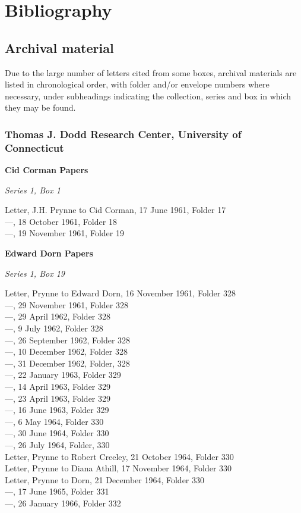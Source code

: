 \documentclass[]{article}
\begin{document}
\setlength{\parindent}{0pt}

\section{Bibliography}\label{bibliography}

\subsection{Archival material}\label{archival-material}

\singlespacing Due to the large number of letters cited from some boxes,
archival materials are listed in chronological order, with folder and/or
envelope numbers where necessary, under subheadings indicating the
collection, series and box in which they may be found.

\subsubsection{Thomas J. Dodd Research Center, University of
Connecticut}\label{thomas-j.-dodd-research-center-university-of-connecticut}

\textbf{Cid Corman Papers}

\emph{Series 1, Box 1}

Letter, J.H. Prynne to Cid Corman, 17 June 1961, Folder 17\\
—, 18 October 1961, Folder 18\\
—, 19 November 1961, Folder 19

\textbf{Edward Dorn Papers}

\emph{Series 1, Box 19}

Letter, Prynne to Edward Dorn, 16 November 1961, Folder 328\\
—, 29 November 1961, Folder 328\\
—, 29 April 1962, Folder 328\\
—, 9 July 1962, Folder 328\\
—, 26 September 1962, Folder 328\\
—, 10 December 1962, Folder 328\\
—, 31 December 1962, Folder, 328\\
—, 22 January 1963, Folder 329\\
—, 14 April 1963, Folder 329\\
—, 23 April 1963, Folder 329\\
—, 16 June 1963, Folder 329\\
—, 6 May 1964, Folder 330\\
—, 30 June 1964, Folder 330\\
—, 26 July 1964, Folder, 330\\
Letter, Prynne to Robert Creeley, 21 October 1964, Folder 330\\
Letter, Prynne to Diana Athill, 17 November 1964, Folder 330\\
Letter, Prynne to Dorn, 21 December 1964, Folder 330\\
—, 17 June 1965, Folder 331\\
—, 26 January 1966, Folder 332
\end{document}
